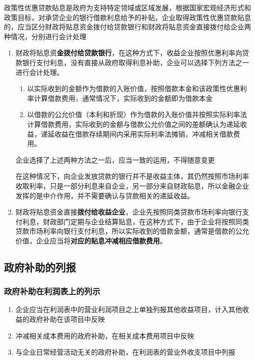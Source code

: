 \documentclass[UTF8,12pt]{ctexart}
\numberwithin{equation}{section} %
\numberwithin{figure}{section}
\numberwithin{table}{section}
\begin{document}
	政策性优惠贷款贴息是政府为支持特定领域或区域发展，根据国家宏观经济形式和政策目标，对承贷企业的银行借款利息给予的补贴，企业取得政策性优惠贷款贴息的，应当区分财政将贴息资金拨付给贷款银行和财政将贴息资金直接拨付给企业两种情况，分别进行会计处理
	\begin{enumerate}
		\item 财政将贴息资\textbf{金拨付给贷款银行}，在这种方式下，收益企业按照优惠利率向贷款银行支付利息，没有直接从政府取得利息补助，企业可以选择下列方法之一进行会计处理。
		\begin{enumerate}
			\item 以实际收到的金额作为借款的入账价值，按照借款本金和该政策性优惠利率计算借款费用，通常情况下，实际收到的金额即为借款本金
			
			\item 以借款的公允价值（本利和折现）作为借款的入账价值并按照实际利率法计算借款费用，实际收到的金额与借款公允价值之间的差额确认为递延收益，递延收益在借款存续期间内采用实际利率法摊销，冲减相关借款费用。
		\end{enumerate}
		企业选择了上述两种方法之一后，应当一致的运用，不得随意变更
		
		在这种情况下，向企业发放贷款的银行并不是收益主体，其仍然按照市场利率收取利率，只是一部分利息来自企业，另一部分来自财政贴息，所以金融企业发挥的是中介作用，并不需要确认与贷款相关的递延收益。
		
		\item 财政将贴息资金直接\textbf{拨付给收益企业}，企业先按照同类贷款市场利率向银行支付利息，财政部门定期与企业结算贴息，在这种方式下，由于企业将按照同类贷款市场利率向银行支付利息，所以实际收到的借款金额，通常是借款的公允价值，企业应当将\textbf{对应的贴息冲减相应借款费用}。
	\end{enumerate}
	
	\subsection{政府补助的列报}
	\subsubsection{政府补助在利润表上的列示}
	\begin{enumerate}
		\item 企业应当在利润表中的营业利润项目之上单独列报其他收益项目，计入其他收益的政府补助在该项目中反映
		
		\item 冲减相关成本费用的政府补助，在相关成本费用项目中反映
		
		\item 与企业日常经营活动无关的政府补助，在利润表的营业外收支项目中列报
	\end{enumerate}
\end{document}
